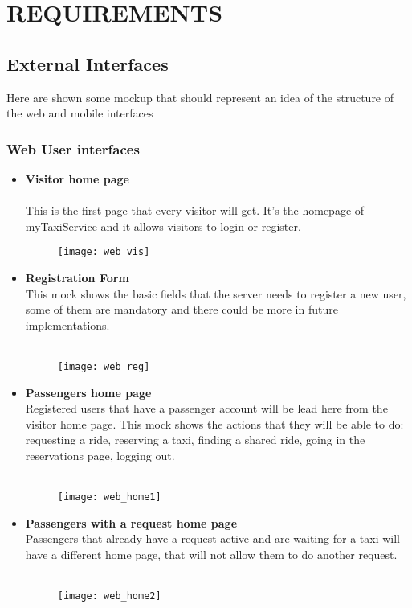 \section{REQUIREMENTS}
\subsection{External Interfaces}
Here are shown some mockup that should represent an idea of the structure of the web and mobile interfaces

\subsubsection{Web User interfaces}
\begin{itemize}
\item \textbf{Visitor home page} \\ \\ This is the first page that every visitor will get. It's the homepage of myTaxiService and it allows visitors to login or register.
\begin{figure}[h]
	\centering	
	\texttt{[image: web\_vis]}
\end{figure}

\newpage\item \textbf{Registration Form} \\  This mock shows the basic fields that the server needs to register a new user, some of them are mandatory and there could be more in future implementations. \\ \\
\begin{figure}[h]
	\centering	
	\texttt{[image: web\_reg]}
\end{figure}

\newpage
\item \textbf{Passengers home page} \\  Registered users that have a passenger account will be lead here from the visitor home page. This mock shows the actions that they will be able to do: requesting a ride, reserving a taxi, finding a shared ride, going in the reservations page, logging out. \\ \\
\begin{figure}[h]
	\centering	
	\texttt{[image: web\_home1]}
\end{figure}
\newpage

\item \textbf{Passengers with a request home page} \\ Passengers that already have a request active and are waiting for a taxi will have a different home page, that will not allow them to do another request. \\ \\
\begin{figure}[h]
	\centering	
	\texttt{[image: web\_home2]}
\end{figure}
\newpage


\end{itemize}
